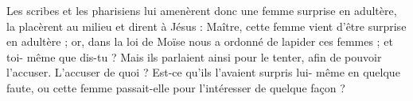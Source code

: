 Les scribes et les pharisiens lui amenèrent donc une femme surprise en adultère, la placèrent au milieu et dirent à Jésus : Maître, cette femme vient d'être surprise en adultère ; or, dans la loi de Moïse nous a ordonné de lapider ces femmes ; et toi- même que dis-tu ? Mais ils parlaient ainsi pour le tenter, afin de pouvoir l'accuser. L’accuser de quoi ? Est-ce qu’ils l’avaient surpris lui- même en quelque faute, ou cette femme passait-elle pour l’intéresser de quelque façon ?
